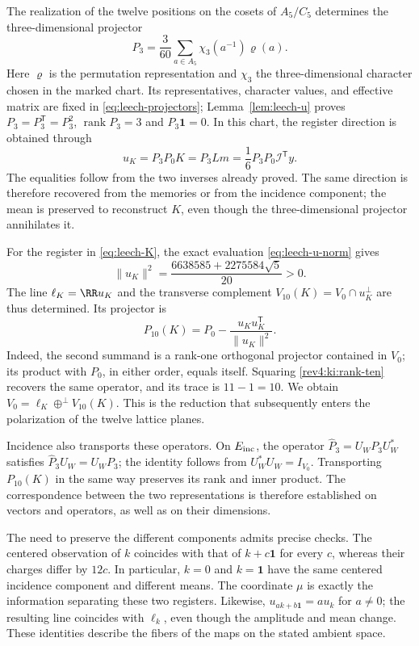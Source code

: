 The realization of the twelve positions on the cosets of
\(A_5/C_5\) determines the three-dimensional projector
\[
 P_3=\frac3{60}\sum_{a\in A_5}
               \chi_3(a^{-1})\varrho(a).
\]
Here \(\varrho\) is the permutation representation and \(\chi_3\)
the three-dimensional character chosen in the marked chart. Its
representatives, character values, and effective matrix are fixed in
\eqref{eq:leech-projectors}; Lemma~\ref{lem:leech-u} proves
\(P_3=P_3^{\mathsf T}=P_3^2\),
\(\operatorname{rank}P_3=3\) and \(P_3\mathbf1=0\).
In this chart, the register direction is obtained through
\begin{equation}
 u_K=P_3P_0K=P_3Lm
     =\frac16P_3P_0\mathcal I^{\mathsf T}y.
 \label{rev4:ki:direction-reconstruction}
\end{equation}
The equalities follow from the two inverses already proved. The same
direction is therefore recovered from the memories or from the
incidence component; the mean is preserved to reconstruct \(K\),
even though the three-dimensional projector annihilates it.

For the register in \eqref{eq:leech-K}, the exact evaluation
\eqref{eq:leech-u-norm} gives
\[
 \|u_K\|^2=
       \frac{6638585+2275584\sqrt5}{20}>0.
\]
The line \(\ell_K=\RR u_K\) and the transverse complement
\(V_{10}(K)=V_0\cap u_K^\perp\) are thus determined.
Its projector is
\begin{equation}
 P_{10}(K)=P_0-
       \frac{u_Ku_K^{\mathsf T}}{\|u_K\|^2}.
 \label{rev4:ki:rank-ten}
\end{equation}
Indeed, the second summand is a rank-one orthogonal projector
contained in \(V_0\); its product with \(P_0\), in either order,
equals itself. Squaring \eqref{rev4:ki:rank-ten} recovers the same
operator, and its trace is \(11-1=10\). We obtain
\(V_0=\ell_K\oplus^\perp V_{10}(K)\).
This is the reduction that subsequently enters the polarization of
the twelve lattice planes.

Incidence also transports these operators. On \(E_{\rm inc}\), the
operator \(\widehat P_3=U_WP_3U_W^*\) satisfies
\(\widehat P_3U_W=U_WP_3\); the identity follows from
\(U_W^*U_W=I_{V_0}\). Transporting \(P_{10}(K)\) in the same
way preserves its rank and inner product. The correspondence between
the two representations is therefore established on vectors and
operators, as well as on their dimensions.

The need to preserve the different components admits precise checks.
The centered observation of \(k\) coincides with that of
\(k+c\mathbf1\) for every \(c\), whereas their charges differ
by \(12c\). In particular, \(k=0\) and \(k=\mathbf1\) have
the same centered incidence component and different means. The
coordinate \(\mu\) is exactly the information separating these two
registers. Likewise, \(u_{ak+b\mathbf1}=a u_k\) for \(a\ne0\);
the resulting line coincides with \(\ell_k\), even though the
amplitude and mean change. These identities describe the fibers of
the maps on the stated ambient space.

